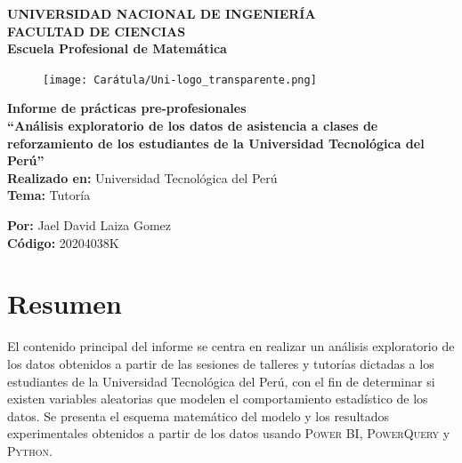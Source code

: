 \documentclass[11pt,a4paper]{book}
\theoremstyle{definition}%
\begin{document}
    \renewcommand{\listtablename}{Índice de tablas}
    \renewcommand{\tablename}{Tabla}
    \thispagestyle{empty}
    \addtocounter{page}{-1}
    \begin{center}
        {\huge \textbf{UNIVERSIDAD NACIONAL DE INGENIERÍA}}\\
    \vspace{0.5cm}
        {\huge \textbf{FACULTAD DE CIENCIAS}}\\
    \vspace{0.25cm}
    {\huge \textbf{Escuela Profesional de Matemática}}\\
    \vspace{0.25cm}
        \begin{figure}[h!]
            \centering
            \texttt{[image: Carátula/Uni-logo\_transparente.png]}
        \end{figure}
    \vspace{0.1cm}
         {\huge \textbf{Informe de prácticas pre-profesionales}}\\
    \vspace{1cm}
    {\huge \textbf{``Análisis exploratorio de los datos de asistencia a clases de reforzamiento de los estudiantes de la Universidad Tecnológica del Perú''}}\\
    \vspace{1cm}
        \LARGE{\textbf{Realizado en: }Universidad Tecnológica del Perú}\\
        \LARGE{\textbf{Tema: }Tutoría}
    \end{center}
    \vspace{1cm}
    
    \begin{center}
        \LARGE{\textbf{Por: }Jael David Laiza Gomez}\\
        \LARGE{\textbf{Código: }20204038K}
    \vspace{1cm}
    
    \date{\LARGE{\today}}
    \makeatletter
    \@date
    \makeatother
    \end{center}
    
    \tableofcontents

    \chapter*{Resumen}
        El contenido principal del informe se centra en realizar un análisis exploratorio de los datos obtenidos a partir de las sesiones de talleres y tutorías dictadas a los estudiantes de la Universidad Tecnológica del Perú, con el fin de determinar si existen variables aleatorias que modelen el comportamiento estadístico de los datos. Se presenta el esquema matemático del modelo y los resultados experimentales obtenidos a partir de los datos usando \textsc{Power BI}, \textsc{PowerQuery} y \textsc{Python}.
\end{document}
